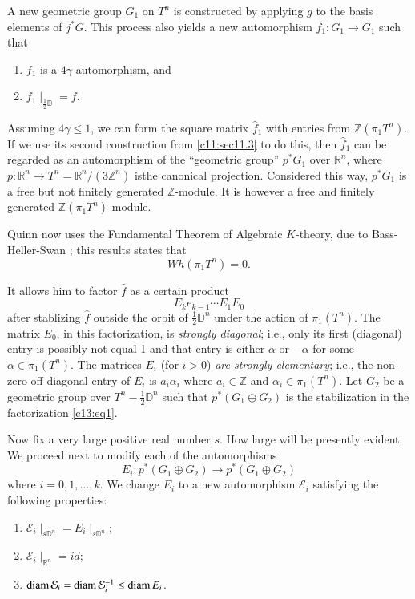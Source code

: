 A new geometric group $G_1$ on $T^n$ is constructed by applying $g$ to
the basis elements of $j^* G$. This process also yields a new
automorphism $f_1: G_1 \to G_1$ such that 
\begin{enumerate}
\item $f_1$ is a $4 \gamma$-automorphism, and 
\item $f_1 \mid_{\frac{1}{2}\mathbb{D}}=f$.
\end{enumerate}

Assuming $4 \gamma \leq 1$, we can form the square matrix $\hat{f}_1$
with entries from $\mathbb{Z}(\pi_1 T^n)$. If we use its second
construction from \ref{c11:sec11.3} to do this, then $\hat{f}_1$ can
be regarded as an automorphism of the ``geometric group'' $p^* G_1$
over $\mathbb{R}^n$, where $p: \mathbb{R}^n \to T^n = \mathbb{R}^n/(3
\mathbb{Z}^n)$ is\pageoriginale the canonical projection. Considered
this way, $p^* G_1$ is a free but not finitely generated
$\mathbb{Z}$-module. It is however a free and finitely generated
$\mathbb{Z} (\pi_1 T^n)$-module.

Quinn now uses the Fundamental Theorem of Algebraic $K$-theory, due to
Bass-Heller-Swan \cite{5}; this results states that
$$
Wh (\pi_1 T^n)=0.
$$

It allows him to factor $\hat{f}$ as a certain product
\begin{equation*}
  E_k e_{k-1} \cdots E_1 E_0 \tag{1}\label{c13:eq1}
\end{equation*}
after stablizing $\hat{f}$ outside the orbit of $\frac{1}{2}
\mathbb{D}^n$ under the action of $\pi_1 (T^n)$. The matrix $E_0$, in
this factorization, is \textit{strongly diagonal}; i.e., only its
first (diagonal) entry is possibly not equal 1 and that entry is
either $\alpha$ or $-\alpha$ for some $\alpha \in \pi_1 (T^n)$. The
matrices $E_i$ (for $i>0$) \textit{are strongly elementary}; i.e., the
non-zero off diagonal entry of $E_i$ is $a_i \alpha_i$ where $a_i
\in \mathbb{Z}$ and $\alpha_i \in \pi_1 (T^n)$. Let $G_2$ be a
geometric group over $T^n- \frac{1}{2} \mathbb{D}^n$ such that $p^*
(G_1 \oplus G_2)$ is the stabilization in the factorization
\eqref{c13:eq1}.

Now fix a very large positive real number $s$. How large will be
presently evident. We proceed next to modify each of the automorphisms
$$
E_i : p^* (G_1 \oplus G_2) \to p^* (G_1 \oplus G_2)
$$
where $i = 0, 1, \ldots , k$. We change $E_i$ to a new automorphism
$\mathcal{E}_i$ satisfying the following properties:
\begin{enumerate}
\item $\mathcal{E}_i \mid_{s\mathbb{D}^n}= E_i \mid_{s \mathbb{D}^n}$;
  \item $\mathcal{E}_i \mid_{\mathbb{R}^n}= id$;
    \item $\operatorname{diam}  \mathcal{E}_i= \operatorname{diam}  \mathcal{E}_i^{-1} \leq \operatorname{diam}  E_i$.
\end{enumerate}

